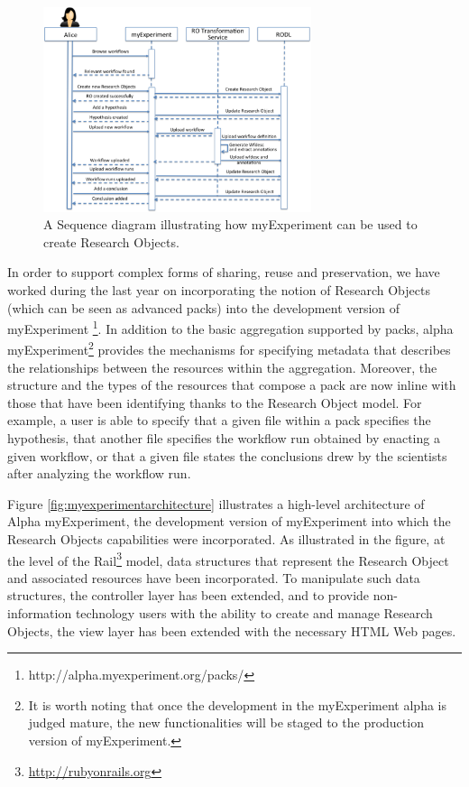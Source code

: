 \begin{figure}
\begin{center}
\includegraphics[width=0.7\textwidth]{Figures/myexperimentInteractions.png}
\end{center}
\caption{A Sequence diagram illustrating how myExperiment can be used to create Research Objects.}
\label{fig:myexperimentinteractions}
\end{figure} 
 
In order to support complex forms of sharing, reuse and preservation, we have worked during the last year on incorporating the notion of Research Objects (which can be seen as advanced packs) into the development version of myExperiment \footnote{http://alpha.myexperiment.org/packs/}. In addition to the basic aggregation supported by packs, alpha myExperiment\footnote{It is worth noting that once the development in the myExperiment alpha is judged mature, the new functionalities will be staged to the production version of myExperiment.} provides the mechanisms for specifying metadata that describes the relationships between the resources within the aggregation. Moreover, the structure and the types of the resources that compose a pack are now inline with those that have been identifying thanks to the Research Object model. For example, a user is able to specify that a given file within a pack specifies the hypothesis, that another file specifies the workflow run obtained by enacting a given workflow, or that a given file states the conclusions drew by the scientists after analyzing the workflow run.


Figure \ref{fig:myexperimentarchitecture} illustrates a high-level architecture of Alpha myExperiment, the development version of myExperiment into which the Research Objects capabilities were incorporated. As illustrated in the figure, at the level of the Rail\footnote{\url{http://rubyonrails.org}} model, data structures that represent the Research Object and associated resources have been incorporated. To manipulate such data structures, the controller layer has been extended, and to provide non-information technology users with the ability to create and manage Research Objects, the view layer has been extended with the necessary HTML Web pages.




